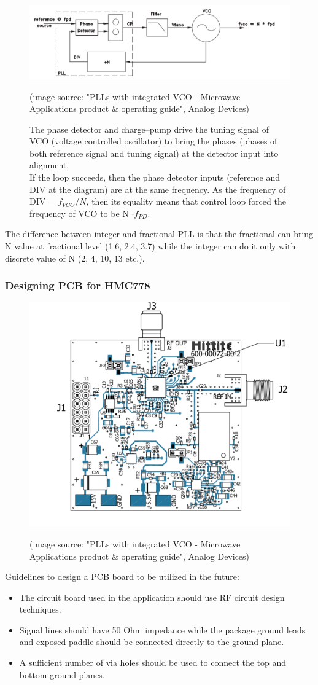 \documentclass[eng,printmode]{mgr}
\begin{document}
\begin{figure}[!h]
{	\centering 	\includegraphics[width=1\linewidth]{pll3}}
\caption{The phase detector and charge--pump drive the tuning signal of VCO (voltage controlled oscillator) to bring the phases (phases of both reference signal and tuning signal) at the detector input into alignment.\\
If the loop succeeds, then the phase detector inputs (reference and DIV at the diagram) are at the same frequency. 
As the frequency of DIV = $f_{VCO} / N$, then its equality means that control loop forced the frequency of VCO to be N $\cdot f_{PD}$.}
\hspace{20pt}

(image source: "PLLs with integrated VCO - Microwave Applications
product \& operating guide", Analog Devices)
\label{fig:pll3}
\end{figure}
\vspace{20pt}
The difference between integer and fractional PLL is that the fractional can bring N value at fractional level (1.6, 2.4, 3.7) while the integer can do it only with discrete value of N (2, 4, 10, 13 etc.).

\newpage
\subsubsection{Designing PCB for HMC778}
\begin{figure}[!h]
	\centering
	\includegraphics[width=0.5\linewidth]{pll2}
	\label{fig:pll2}
	\caption{}
	(image source: "PLLs with integrated VCO - Microwave Applications
	product \& operating guide", Analog Devices)
\end{figure}
Guidelines to design a PCB board to be utilized in the future:
\begin{itemize}
	\item The circuit board used in the application should use RF circuit design techniques. 
	\item Signal lines should have
	50 Ohm impedance while the package ground leads and exposed paddle should be connected directly
	to the ground plane. 
	\item A sufficient number of via holes should be used to connect the
	top and bottom ground planes.
\end{itemize}
\end{document}
